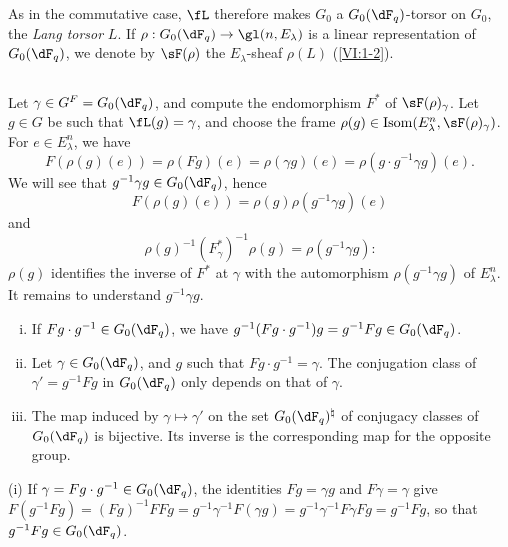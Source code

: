 \documentclass[oneside]{book}
\begin{document}
As in the commutative case, $\fL$ therefore makes $G_0$ a $G_0(\dF_q)$-torsor 
on $G_0$, the \emph{Lang torsor} $L$. If 
$\rho:G_0(\dF_q) \to \gl(n,E_\lambda)$ is a linear representation of 
$G_0(\dF_q)$, we denote by $\sF(\rho)$ the $E_\lambda$-sheaf $\rho(L)$ 
(\ref{VI:1-2}). 





\subsection{}\label{VI:1-23}

Let $\gamma\in G^F=G_0(\dF_q)$, and compute the endomorphism $F^\ast$ of 
$\sF(\rho)_\gamma$. Let $g\in G$ be such that $\fL(g)=\gamma$, and choose the frame 
$\rho(g)\in \operatorname{Isom}(E_\lambda^n,\sF(\rho)_\gamma)$. For 
$e\in E_\lambda^n$, we have 
\[
  F(\rho(g)(e)) = \rho(F g)(e) = \rho(\gamma g)(e) = \rho(g\cdot g^{-1}\gamma g)(e) \text{.}
\]
We will see that $g^{-1} \gamma g\in G_0(\dF_q)$, hence 
\[
  F(\rho(g)(e)) = \rho(g) \rho(g^{-1}\gamma g)(e)
\]
and 
\begin{equation*}\tag{1.23.1}\label{VI:eq:1-23-1}
  \rho(g)^{-1} (F_\gamma^\ast)^{-1} \rho(g) = \rho(g^{-1} \gamma g) \text{:}
\end{equation*}
$\rho(g)$ identifies the inverse of $F^\ast$ at $\gamma$ with the automorphism 
$\rho(g^{-1} \gamma g)$ of $E_\lambda^n$. It remains to understand 
$g^{-1} \gamma g$.

\begin{lemma_}\label{VI:1-24}
\begin{enumerate}[(i)]
  \item If $F g\cdot g^{-1} \in G_0(\dF_q)$, we have 
    $g^{-1} (F g\cdot g^{-1}) g = g^{-1} F g\in G_0(\dF_q)$.
  \item Let $\gamma\in G_0(\dF_q)$, and $g$ such that 
    $F g\cdot g^{-1} = \gamma$. The conjugation class of $\gamma'=g^{-1} Fg$ 
    in $G_0(\dF_q)$ only depends on that of $\gamma$. 
  \item The map induced by $\gamma\mapsto \gamma'$ on the set 
    $G_0(\dF_q)^\natural$ of conjugacy classes of $G_0(\dF_q)$ 
    is bijective. Its inverse is the corresponding map for the opposite 
    group. 
\end{enumerate}
\end{lemma_}

(i) If $\gamma= F g\cdot g^{-1}\in G_0(\dF_q)$, the identities $F g=\gamma g$ 
and 
$F\gamma=\gamma$ give $F(g^{-1} F g) = (F g)^{-1} F F g = g^{-1} \gamma^{-1} F(\gamma g) = g^{-1} \gamma^{-1} F \gamma F g = g^{-1} F g$, 
so that $g^{-1} F g \in G_0(\dF_q)$. 
\end{document}
